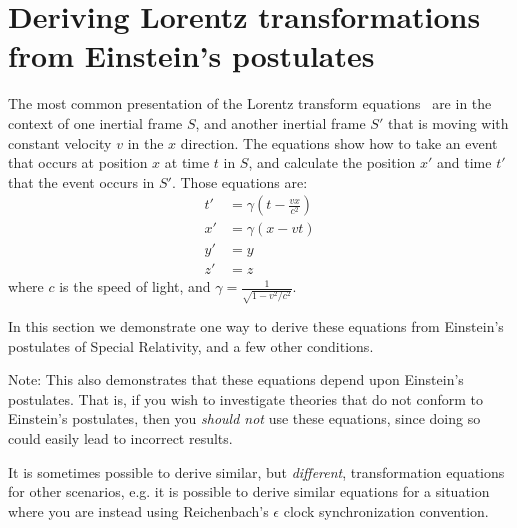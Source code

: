 \documentclass[a4paper]{article}
\theoremstyle{plain}
\theoremstyle{definition}
\begin{document}
\section{Deriving Lorentz transformations from Einstein's postulates}
\label{app:deriving-lorentz-transformations}

The most common presentation of the Lorentz transform
equations~\cite{LorentzTransformation} are in the context of one
inertial frame $S$, and another inertial frame $S'$ that is moving
with constant velocity $v$ in the $x$ direction.
The equations show how to take an event that occurs at position $x$ at
time $t$ in $S$, and calculate the position $x'$ and time $t'$ that
the event occurs in $S'$.
Those equations are:
\begin{align}
t' & = \gamma (t - \frac{vx}{c^2}) \label{eqn:1d-lorentz-transform-t-prime} \\
x' & = \gamma (x - vt) \label{eqn:1d-lorentz-transform-x-prime} \\
y' & = y \label{eqn:1d-lorentz-transform-y-prime} \\
z' & = z \label{eqn:1d-lorentz-transform-z-prime}
\end{align}
where $c$ is the speed of light, and
$\gamma = \frac{1}{\sqrt{1 - v^2/c^2}}$.

In this section we demonstrate one way to derive these equations from
Einstein's postulates of Special Relativity, and a few other
conditions.

Note: This also demonstrates that these equations depend upon
Einstein's postulates.  That is, if you wish to investigate theories
that do not conform to Einstein's postulates, then you
{\em should not} use these equations, since doing so could easily lead
to incorrect results.

It is sometimes possible to derive similar, but {\em different},
transformation equations for other scenarios, e.g. it is possible to
derive similar equations for a situation where you are instead using
Reichenbach's $\epsilon$ clock synchronization convention.

\newcommand{\erp}{\textbf{EP1}}
\newcommand{\esol}{\textbf{EP2}}
\newcommand{\homogeneity}{\textbf{Homogeneity}}
\newcommand{\linearity}{\textbf{Linearity}}
\end{document}
